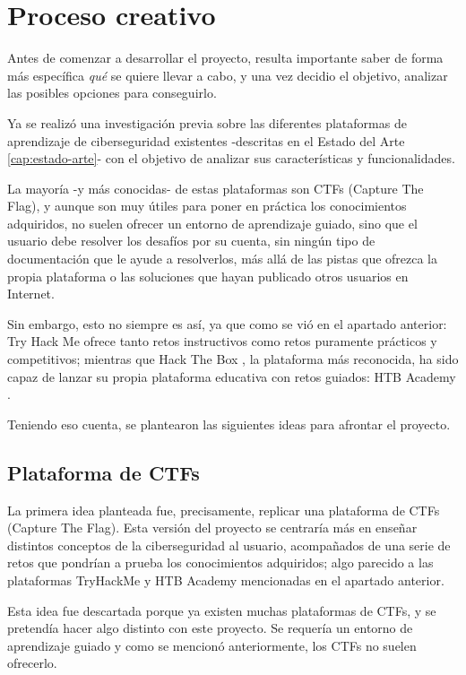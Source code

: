     \section{Proceso creativo}
        \label{sec:proceso-creativo}

        Antes de comenzar a desarrollar el proyecto, resulta importante saber de forma más específica \textit{qué} se quiere llevar a cabo, y una vez decidio el objetivo, analizar las posibles opciones para conseguirlo.
        
        Ya se realizó una investigación previa sobre las diferentes plataformas de aprendizaje de ciberseguridad existentes -descritas en el Estado del Arte \ref{cap:estado-arte}- con el objetivo de analizar sus características y funcionalidades.
        
        La mayoría -y más conocidas- de estas plataformas son CTFs (Capture The Flag), y aunque son muy útiles para poner en práctica los conocimientos adquiridos, no suelen ofrecer un entorno de aprendizaje guiado, sino que el usuario debe resolver los desafíos por su cuenta, sin ningún tipo de documentación que le ayude a resolverlos, más allá de las pistas que ofrezca la propia plataforma o las soluciones que hayan publicado otros usuarios en Internet.

        Sin embargo, esto no siempre es así, ya que como se vió en el apartado anterior: Try Hack Me \cite{tryhackme} ofrece tanto retos instructivos como retos puramente prácticos y competitivos; mientras que Hack The Box \cite{hackthebox}, la plataforma más reconocida, ha sido capaz de lanzar su propia plataforma educativa con retos guiados: HTB Academy \cite{hackthebox-academy}.

        Teniendo eso cuenta, se plantearon las siguientes ideas para afrontar el proyecto.


        \subsection{Plataforma de CTFs}

            La primera idea planteada fue, precisamente, replicar una plataforma de CTFs (Capture The Flag). Esta versión del proyecto se centraría más en enseñar distintos conceptos de la ciberseguridad al usuario, acompañados de una serie de retos que pondrían a prueba los conocimientos adquiridos; algo parecido a las plataformas TryHackMe y HTB Academy mencionadas en el apartado anterior.

            Esta idea fue descartada porque ya existen muchas plataformas de CTFs, y se pretendía hacer algo distinto con este proyecto. Se requería un entorno de aprendizaje guiado y como se mencionó anteriormente, los CTFs no suelen ofrecerlo.

